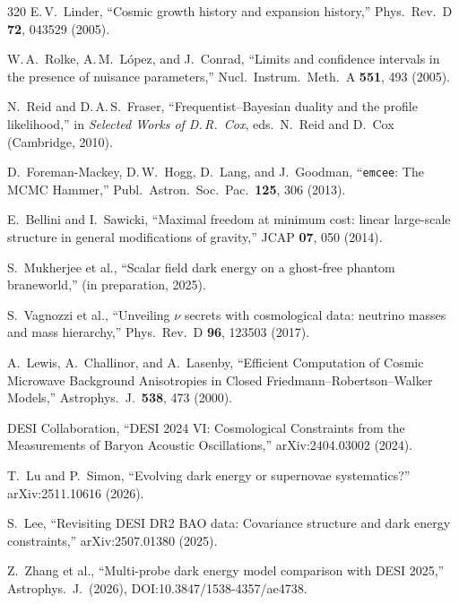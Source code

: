 \begin{thebibliography}{320}
E.\,V.\ Linder,
``Cosmic growth history and expansion history,''
Phys.\ Rev.\ D \textbf{72}, 043529 (2005).

W.\,A.\ Rolke, A.\,M.\ L\'{o}pez, and J.\ Conrad,
``Limits and confidence intervals in the presence of nuisance parameters,''
Nucl.\ Instrum.\ Meth.\ A \textbf{551}, 493 (2005).

N.\ Reid and D.\,A.\,S.\ Fraser,
``Frequentist--Bayesian duality and the profile likelihood,''
in \textit{Selected Works of D.\,R.\ Cox}, eds.\ N.\ Reid and D.\ Cox (Cambridge, 2010).

D.\ Foreman-Mackey, D.\,W.\ Hogg, D.\ Lang, and J.\ Goodman,
``\texttt{emcee}: The MCMC Hammer,''
Publ.\ Astron.\ Soc.\ Pac.\ \textbf{125}, 306 (2013).

E.\ Bellini and I.\ Sawicki,
``Maximal freedom at minimum cost: linear large-scale structure in general modifications of gravity,''
JCAP \textbf{07}, 050 (2014).

S.\ Mukherjee et al.,
``Scalar field dark energy on a ghost-free phantom braneworld,''
(in preparation, 2025).

S.\ Vagnozzi et al.,
``Unveiling $\nu$ secrets with cosmological data: neutrino masses and mass hierarchy,''
Phys.\ Rev.\ D \textbf{96}, 123503 (2017).

A.\ Lewis, A.\ Challinor, and A.\ Lasenby,
``Efficient Computation of Cosmic Microwave Background Anisotropies in Closed Friedmann--Robertson--Walker Models,''
Astrophys.\ J.\ \textbf{538}, 473 (2000).

DESI Collaboration,
``DESI 2024 VI: Cosmological Constraints from the Measurements of Baryon Acoustic Oscillations,''
arXiv:2404.03002 (2024).

T.\ Lu and P.\ Simon,
``Evolving dark energy or supernovae systematics?''
arXiv:2511.10616 (2026).

S.~Lee,
``Revisiting DESI DR2 BAO data: Covariance structure and dark energy constraints,''
arXiv:2507.01380 (2025).

Z.~Zhang et al.,
``Multi-probe dark energy model comparison with DESI 2025,''
Astrophys.\ J.\ (2026),
DOI:10.3847/1538-4357/ae4738.




\end{thebibliography}
